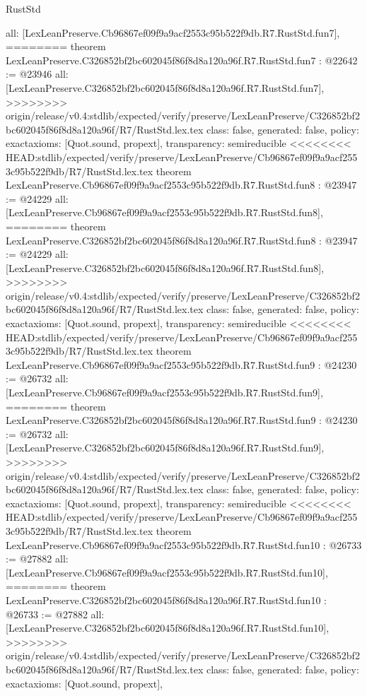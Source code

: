 \begin{lexlean}{RustStd}
\begin{coremodule}
{\begin{coremodule}
{{{{{{{{{{  all: [LexLeanPreserve.Cb96867ef09f9a9acf2553c95b522f9db.R7.RustStd.fun7],
========
theorem LexLeanPreserve.C326852bf2bc602045f86f8d8a120a96f.R7.RustStd.fun7 : @22642 := @23946 {
  all: [LexLeanPreserve.C326852bf2bc602045f86f8d8a120a96f.R7.RustStd.fun7],
>>>>>>>> origin/release/v0.4:stdlib/expected/verify/preserve/LexLeanPreserve/C326852bf2bc602045f86f8d8a120a96f/R7/RustStd.lex.tex
  class: false,
  generated: false,
  policy: exact{axioms: [Quot.sound, propext]},
  transparency: semireducible
}
<<<<<<<< HEAD:stdlib/expected/verify/preserve/LexLeanPreserve/Cb96867ef09f9a9acf2553c95b522f9db/R7/RustStd.lex.tex
theorem LexLeanPreserve.Cb96867ef09f9a9acf2553c95b522f9db.R7.RustStd.fun8 : @23947 := @24229 {
  all: [LexLeanPreserve.Cb96867ef09f9a9acf2553c95b522f9db.R7.RustStd.fun8],
========
theorem LexLeanPreserve.C326852bf2bc602045f86f8d8a120a96f.R7.RustStd.fun8 : @23947 := @24229 {
  all: [LexLeanPreserve.C326852bf2bc602045f86f8d8a120a96f.R7.RustStd.fun8],
>>>>>>>> origin/release/v0.4:stdlib/expected/verify/preserve/LexLeanPreserve/C326852bf2bc602045f86f8d8a120a96f/R7/RustStd.lex.tex
  class: false,
  generated: false,
  policy: exact{axioms: [Quot.sound, propext]},
  transparency: semireducible
}
<<<<<<<< HEAD:stdlib/expected/verify/preserve/LexLeanPreserve/Cb96867ef09f9a9acf2553c95b522f9db/R7/RustStd.lex.tex
theorem LexLeanPreserve.Cb96867ef09f9a9acf2553c95b522f9db.R7.RustStd.fun9 : @24230 := @26732 {
  all: [LexLeanPreserve.Cb96867ef09f9a9acf2553c95b522f9db.R7.RustStd.fun9],
========
theorem LexLeanPreserve.C326852bf2bc602045f86f8d8a120a96f.R7.RustStd.fun9 : @24230 := @26732 {
  all: [LexLeanPreserve.C326852bf2bc602045f86f8d8a120a96f.R7.RustStd.fun9],
>>>>>>>> origin/release/v0.4:stdlib/expected/verify/preserve/LexLeanPreserve/C326852bf2bc602045f86f8d8a120a96f/R7/RustStd.lex.tex
  class: false,
  generated: false,
  policy: exact{axioms: [Quot.sound, propext]},
  transparency: semireducible
}
<<<<<<<< HEAD:stdlib/expected/verify/preserve/LexLeanPreserve/Cb96867ef09f9a9acf2553c95b522f9db/R7/RustStd.lex.tex
theorem LexLeanPreserve.Cb96867ef09f9a9acf2553c95b522f9db.R7.RustStd.fun10 : @26733 := @27882 {
  all: [LexLeanPreserve.Cb96867ef09f9a9acf2553c95b522f9db.R7.RustStd.fun10],
========
theorem LexLeanPreserve.C326852bf2bc602045f86f8d8a120a96f.R7.RustStd.fun10 : @26733 := @27882 {
  all: [LexLeanPreserve.C326852bf2bc602045f86f8d8a120a96f.R7.RustStd.fun10],
>>>>>>>> origin/release/v0.4:stdlib/expected/verify/preserve/LexLeanPreserve/C326852bf2bc602045f86f8d8a120a96f/R7/RustStd.lex.tex
  class: false,
  generated: false,
  policy: exact{axioms: [Quot.sound, propext]},
}}}}}}}}}}}}}}
\end{coremodule}}
\end{coremodule}
\end{lexlean}
